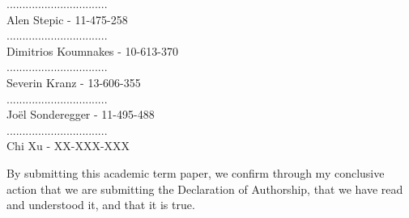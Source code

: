 \documentclass[a4paper,12pt]{article}
\begin{document}
\begin{flushleft}
................................\\
Alen Stepic - 11-475-258\\\bigskip\bigskip  
................................\\
Dimitrios Koumnakes - 10-613-370\\\bigskip\bigskip
................................\\
Severin Kranz - 13-606-355\\\bigskip\bigskip
................................\\
Joël Sonderegger - 11-495-488\\\bigskip\bigskip
................................\\
Chi Xu - XX-XXX-XXX

By submitting this academic term paper, we confirm through my conclusive action that we are submitting the Declaration of Authorship, that we have read and understood it, and that it is true.

\end{flushleft}
\clearpage

\end{document}

